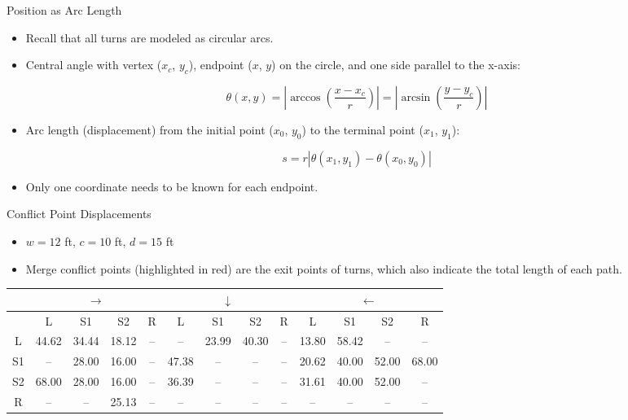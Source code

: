 
\begin{frame}{Position as Arc Length}
\begin{itemize}
\item Recall that all turns are modeled as circular arcs.
\item Central angle with vertex ($x_c$, $y_c$), endpoint ($x$, $y$)
	on the circle, and one side parallel to the x-axis:
\end{itemize}
\begin{equation}
\theta(x, y) = \left| \arccos\left(\frac{x - x_c}{r}\right) \right|
	= \left| \arcsin\left(\frac{y - y_c}{r}\right) \right|
\end{equation}

\begin{itemize}
\item Arc length (displacement) from the initial point ($x_0$, $y_0$)
	to the terminal point ($x_1$, $y_1$):
\end{itemize}
\begin{equation}
s = r |\theta(x_1, y_1) - \theta(x_0, y_0)|
\end{equation}

\begin{itemize}
\item Only one coordinate needs to be known for each endpoint.
\end{itemize}
\end{frame}


\begin{frame}{Conflict Point Displacements}
\begin{itemize}
\item $w = 12$ ft, $c = 10$ ft, $d = 15$ ft
\item Merge conflict points (highlighted in {\color{red} red})
	are the exit points of turns, which also indicate the total
	length of each path.
\end{itemize}

\begin{center}
\scriptsize\setlength{\tabcolsep}{3pt}
	\begin{tabular}{| c | c c c c | c c c c | c c c c |}
	\multicolumn{1}{c}{}
		& \multicolumn{4}{c}{\large $\longrightarrow$}
		& \multicolumn{4}{c}{\large $\downarrow$}
		& \multicolumn{4}{c}{\large $\longleftarrow$} \\
	\hline
	{}
		& L & S1 & S2 & R
		& L & S1 & S2 & R
		& L & S1 & S2 & R \\
	\hline
	L
		& 44.62 & 34.44 & 18.12 & --
		&   --   & 23.99 & 40.30 & --
		& 13.80 & {\color{red} 58.42} & -- & -- \\
	S1
		& -- & 28.00 & 16.00 & --
		& 47.38 & -- & -- & --
		& 20.62 & 40.00 & 52.00 & {\color{red} 68.00} \\
	S2
		& {\color{red} 68.00} & 28.00 & 16.00 & --
		& 36.39 & -- & -- & --
		& 31.61 & 40.00 & 52.00 & -- \\
	R
		& -- & -- & {\color{red} 25.13} & --
		& -- & -- & -- & --
		& -- & -- & -- & -- \\
	\hline
	\end{tabular}
\end{center}
\end{frame}

